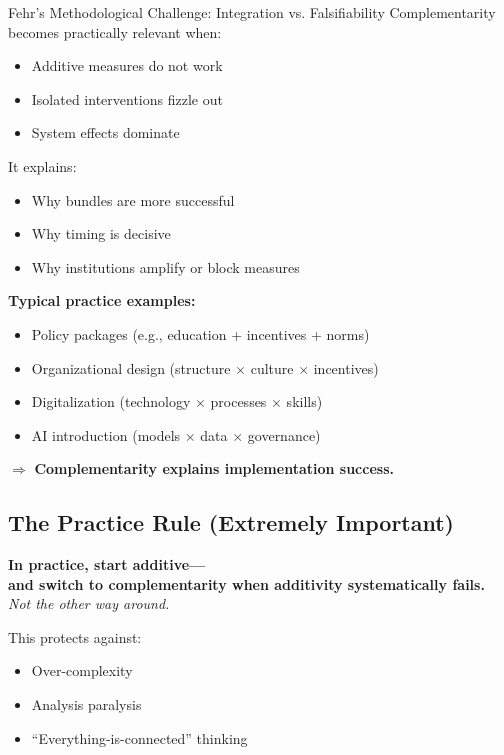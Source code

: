 \begin{chapter}{Fehr's Methodological Challenge: Integration vs. Falsifiability}
Complementarity becomes practically relevant when:
\begin{itemize}[noitemsep]
    \item Additive measures do not work
    \item Isolated interventions fizzle out
    \item System effects dominate
\end{itemize}

It explains:
\begin{itemize}[noitemsep]
    \item Why bundles are more successful
    \item Why timing is decisive
    \item Why institutions amplify or block measures
\end{itemize}

\textbf{Typical practice examples:}
\begin{itemize}[noitemsep]
    \item Policy packages (e.g., education + incentives + norms)
    \item Organizational design (structure $\times$ culture $\times$ incentives)
    \item Digitalization (technology $\times$ processes $\times$ skills)
    \item AI introduction (models $\times$ data $\times$ governance)
\end{itemize}

$\Rightarrow$ \textbf{Complementarity explains implementation success.}

\subsection{The Practice Rule (Extremely Important)}

\begin{tcolorbox}[colback=red!5!white,colframe=red!75!black,title=\textbf{The Sequence Rule}]
\begin{center}
\large
\textbf{In practice, start additive---}\\
\textbf{and switch to complementarity when additivity systematically fails.}\\[0.5em]
\textit{Not the other way around.}
\end{center}
\end{tcolorbox}

This protects against:
\begin{itemize}[noitemsep]
    \item Over-complexity
    \item Analysis paralysis
    \item ``Everything-is-connected'' thinking
\end{itemize}


\end{chapter}
